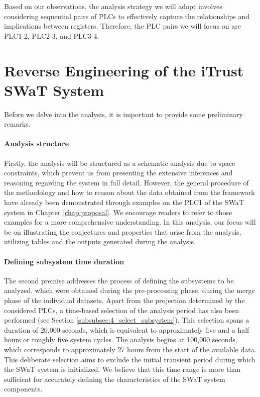 \bigskip
Based on our observations, the analysis strategy we will adopt involves considering sequential pairs of PLCs to effectively capture the relationships and implications between registers. Therefore, the PLC pairs we will focus on are PLC1-2, PLC2-3, and PLC3-4. 

\section{Reverse Engineering of the iTrust SWaT System}
\label{sec:6_reverse_SWaT}
Before we delve into the analysis, it is important to provide some preliminary remarks. 

\paragraph{Analysis structure}
\label{par:6_analysis_struture}
Firstly, the analysis will be structured as a schematic analysis due to space constraints, which prevent us from presenting the extensive inferences and reasoning regarding the system in full detail. However, the general procedure of the methodology and how to reason about the data obtained from the framework have already been demonstrated through examples on the PLC1 of the SWaT system in Chapter \ref{chap:proposal}. We encourage readers to refer to those examples for a more comprehensive understanding. In this analysis, our focus will be on illustrating the conjectures and properties that arise from the analysis, utilizing tables and the outputs generated during the analysis.

\paragraph{Defining subsystem time duration}
\label{par:6_subsystem_duration}
The second premise addresses the process of defining the subsystems to be analyzed, which were obtained during the pre-processing phase, during the merge phase of the individual datasets. Apart from the projection determined by the considered PLCs, a time-based selection of the analysis period has also been performed (see Section \ref{subsubsec:4_select_subsystem}). This selection spans a duration of 20,000 seconds, which is equivalent to approximately five and a half hours or roughly five system cycles. The analysis begins at 100,000 seconds, which corresponds to approximately 27 hours from the start of the available data. This deliberate selection aims to exclude the initial transient period during which the SWaT system is initialized. We believe that this time range is more than sufficient for accurately defining the characteristics of the SWaT system components.

